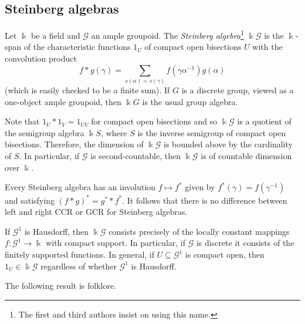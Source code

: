 \documentclass[11pt,reqno]{amsart}
\theoremstyle{plain}
\numberwithin{equation}{section}
\begin{document}
\subsection{Steinberg algebras}
Let $\Bbbk$ be a field and $\mathscr G$ an ample groupoid.  The \emph{Steinberg algebra}\footnote{The first and third authors insist on using this name.} $\Bbbk \mathscr G$ is the $\Bbbk$-span of the characteristic functions $1_U$ of compact open bisections $U$ with the convolution product
\[f\ast g(\gamma) =\sum_{s(\alpha)=s(\gamma)}f(\gamma\alpha^{-1})g(\alpha)\] (which is easily checked to be a finite sum).  If $G$ is a discrete group, viewed as a one-object ample groupoid, then $\Bbbk G$ is the usual group algebra.

Note that $1_U\ast 1_V=1_{UV}$ for compact open bisections and so $\Bbbk \mathscr G$ is a quotient of the semigroup algebra $\Bbbk S$, where $S$ is the inverse semigroup of compact open bisections.  Therefore, the dimension of $\Bbbk\mathscr G$ is bounded above by the cardinality of $S$.  In particular, if $\mathscr G$ is second-countable, then $\Bbbk \mathscr G$ is of countable dimension over $\Bbbk$.

Every Steinberg algebra has an involution $f\mapsto f^*$ given by $f^*(\gamma) = f(\gamma^{-1})$ and satisfying $(f\ast g)^{\ast}= g^{\ast}\ast f^{\ast}$.  It follows that there is no difference between left and right CCR or GCR for Steinberg algebras.

If $\mathscr G^1$ is Hausdorff, then $\Bbbk \mathscr G$ consists precisely of the locally constant mappings $f\colon \mathscr G^1\to \Bbbk$ with compact support.  In particular, if $\mathscr G$ is discrete it consists of the finitely supported functions. In general, if $U\subseteq \mathscr G^1$ is compact open, then $1_U\in \Bbbk\mathscr G$ regardless of whether $\mathscr G^1$ is Hausdorff.

The following result is folklore.
\end{document}
